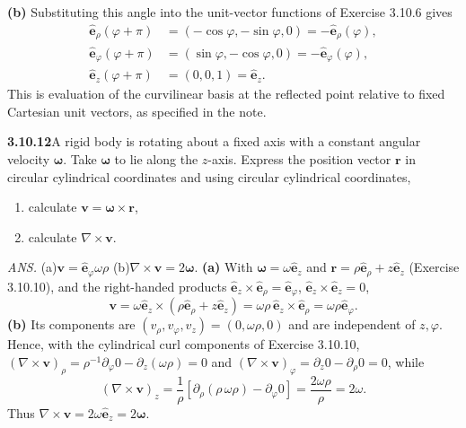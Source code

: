 \textbf{(b)} Substituting this angle into the unit-vector functions of
Exercise 3.10.6 gives
\[
\begin{aligned}
\hat{\mathbf e}_\rho(\varphi+\pi)&=(-\cos\varphi,-\sin\varphi,0)
=-\hat{\mathbf e}_\rho(\varphi),\\
\hat{\mathbf e}_\varphi(\varphi+\pi)&=(\sin\varphi,-\cos\varphi,0)
=-\hat{\mathbf e}_\varphi(\varphi),\\
\hat{\mathbf e}_z(\varphi+\pi)&=(0,0,1)=\hat{\mathbf e}_z.
\end{aligned}
\]
This is evaluation of the curvilinear basis at the reflected point
relative to fixed Cartesian unit vectors, as specified in the note.

\par\bigskip
\noindent\textbf{3.10.12}\quad A rigid body is rotating about a fixed axis
with a constant angular velocity $\boldsymbol{\omega}$. Take
$\boldsymbol{\omega}$ to lie along the $z$-axis. Express the position vector
$\mathbf{r}$ in circular cylindrical coordinates and using circular
cylindrical coordinates,
\begin{enumerate}
\item[(a)] calculate $\mathbf{v}=\boldsymbol{\omega}\times\mathbf{r}$,
\item[(b)] calculate $\nabla\times\mathbf{v}$.
\end{enumerate}
\par\nobreak\hfill\emph{ANS.}\enspace
(a)\enspace$\mathbf{v}=\hat{\mathbf{e}}_{\varphi}\omega\rho$\quad
(b)\enspace$\nabla\times\mathbf{v}=2\boldsymbol{\omega}$.
\solution
\textbf{(a)} With $\boldsymbol\omega=\omega\hat{\mathbf e}_z$ and
$\mathbf r=\rho\hat{\mathbf e}_\rho+z\hat{\mathbf e}_z$
(Exercise 3.10.10), and the right-handed products
$\hat{\mathbf e}_z\times\hat{\mathbf e}_\rho=\hat{\mathbf e}_\varphi$,
$\hat{\mathbf e}_z\times\hat{\mathbf e}_z=0$,
\[
\mathbf v=\omega\hat{\mathbf e}_z\times
(\rho\hat{\mathbf e}_\rho+z\hat{\mathbf e}_z)
=\omega\rho\,\hat{\mathbf e}_z\times\hat{\mathbf e}_\rho
=\boxed{\omega\rho\hat{\mathbf e}_\varphi}.
\]
\textbf{(b)} Its components are $(v_\rho,v_\varphi,v_z)=(0,\omega\rho,0)$
and are independent of $z,\varphi$. Hence, with the cylindrical curl
components of Exercise 3.10.10,
$(\nabla\times\mathbf v)_\rho=\rho^{-1}\partial_\varphi0-\partial_z(\omega\rho)=0$
and $(\nabla\times\mathbf v)_\varphi=\partial_z0-\partial_\rho0=0$, while
\[
(\nabla\times\mathbf v)_z
=\frac1\rho[\partial_\rho(\rho\,\omega\rho)-\partial_\varphi0]
=\frac{2\omega\rho}{\rho}=2\omega.
\]
Thus $\boxed{\nabla\times\mathbf v=2\omega\hat{\mathbf e}_z=2\boldsymbol\omega}$.

